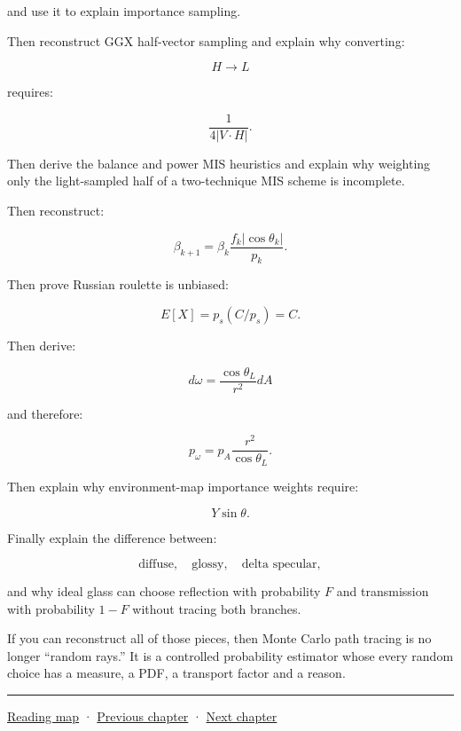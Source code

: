 and use it to explain importance sampling.

Then reconstruct GGX half-vector sampling and explain why converting:

\[
H\rightarrow L
\]

requires:

\[
\frac1{4|V\cdot H|}.
\]

Then derive the balance and power MIS heuristics and explain why weighting only the light-sampled half of a two-technique MIS scheme is incomplete.

Then reconstruct:

\[
\beta_{k+1}
=
\beta_k
\frac{
f_k|\cos\theta_k|
}{
p_k
}.
\]

Then prove Russian roulette is unbiased:

\[
E[X]=
p_s(C/p_s)=C.
\]

Then derive:

\[
d\omega
=
\frac{
\cos\theta_L
}{
r^2
}
dA
\]

and therefore:

\[
p_\omega
=
p_A
\frac{
r^2
}{
\cos\theta_L
}.
\]

Then explain why environment-map importance weights require:

\[
Y\sin\theta.
\]

Finally explain the difference between:

\[
\text{diffuse},
\quad
\text{glossy},
\quad
\text{delta specular},
\]

and why ideal glass can choose reflection with probability \(F\) and transmission with probability \(1-F\) without tracing both branches.

If you can reconstruct all of those pieces, then Monte Carlo path tracing is no longer ``random rays.'' It is a controlled probability estimator whose every random choice has a measure, a PDF, a transport factor and a reason.

\begin{center}\rule{0.5\linewidth}{0.5pt}\end{center}

\hyperref[volume-reading-map]{Reading map} · \hyperref[03-visual-computing-i-ch008]{Previous chapter} · \hyperref[03-visual-computing-i-ch010]{Next chapter}
